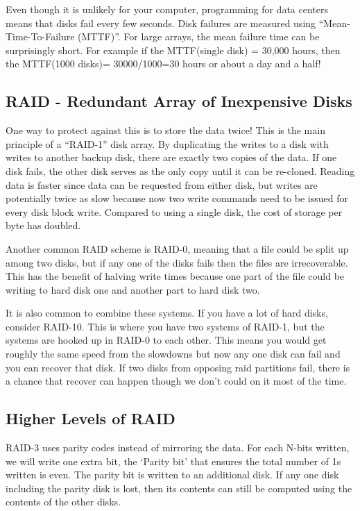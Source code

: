 Even though it is unlikely for your computer, programming for data centers means that disks fail every few seconds.
Disk failures are measured using ``Mean-Time-To-Failure (MTTF)''.
For large arrays, the mean failure time can be surprisingly short.
For example if the MTTF(single disk) = 30,000 hours, then the MTTF(1000 disks)= 30000/1000=30 hours or about a day and a half!

\subsection{RAID - Redundant Array of Inexpensive Disks}

One way to protect against this is to store the data twice! This is the main principle of a ``RAID-1'' disk array.
By duplicating the writes to a disk with writes to another backup disk, there are exactly two copies of the data.
If one disk fails, the other disk serves as the only copy until it can be re-cloned.
Reading data is faster since data can be requested from either disk, but writes are potentially twice as slow because now two write commands need to be issued for every disk block write.
Compared to using a single disk, the cost of storage per byte has doubled.

Another common RAID scheme is RAID-0, meaning that a file could be split up among two disks, but if any one of the disks fails then the files are irrecoverable.
This has the benefit of halving write times because one part of the file could be writing to hard disk one and another part to hard disk two.


It is also common to combine these systems.
If you have a lot of hard disks, consider RAID-10.
This is where you have two systems of RAID-1, but the systems are hooked up in RAID-0 to each other.
This means you would get roughly the same speed from the slowdowns but now any one disk can fail and you can recover that disk.
If two disks from opposing raid partitions fail, there is a chance that recover can happen though we don't could on it most of the time.

\subsection{Higher Levels of RAID}

RAID-3 uses parity codes instead of mirroring the data.
For each N-bits written, we will write one extra bit, the `Parity bit' that ensures the total number of 1s written is even.
The parity bit is written to an additional disk.
If any one disk including the parity disk is lost, then its contents can still be computed using the contents of the other disks.

